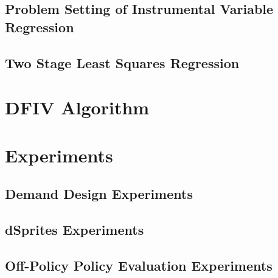 \documentclass{article}
\begin{document}
\subsection{Problem Setting of Instrumental Variable Regression} \label{sec:problem_setting}

\subsection{Two Stage Least Squares Regression}\label{sec:KIV}


%

%

\section{DFIV Algorithm}\label{sec:algorithm}

% 


\section{Experiments} \label{sec:experiment}

\subsection{Demand Design Experiments}

\subsection{dSprites Experiments}

\subsection{Off-Policy Policy Evaluation Experiments}

\end{document}

